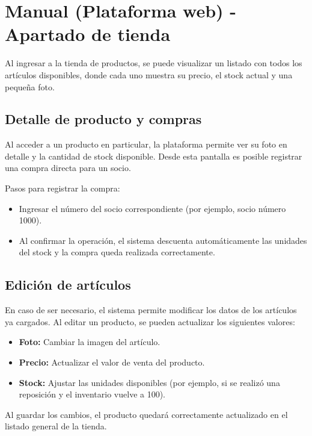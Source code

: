 \section{Manual (Plataforma web) - Apartado de tienda}

Al ingresar a la tienda de productos, se puede visualizar un listado con todos los artículos disponibles, donde cada uno muestra su precio, el stock actual y una pequeña foto.

\subsection{Detalle de producto y compras}
Al acceder a un producto en particular, la plataforma permite ver su foto en detalle y la cantidad de stock disponible. Desde esta pantalla es posible registrar una compra directa para un socio.

Pasos para registrar la compra:
\begin{itemize}
    \item Ingresar el número del socio correspondiente (por ejemplo, socio número 1000).
    \item Al confirmar la operación, el sistema descuenta automáticamente las unidades del stock y la compra queda realizada correctamente.
\end{itemize}

\subsection{Edición de artículos}
En caso de ser necesario, el sistema permite modificar los datos de los artículos ya cargados. Al editar un producto, se pueden actualizar los siguientes valores:

\begin{itemize}
    \item \textbf{Foto:} Cambiar la imagen del artículo.
    \item \textbf{Precio:} Actualizar el valor de venta del producto.
    \item \textbf{Stock:} Ajustar las unidades disponibles (por ejemplo, si se realizó una reposición y el inventario vuelve a 100).
\end{itemize}

Al guardar los cambios, el producto quedará correctamente actualizado en el listado general de la tienda.
